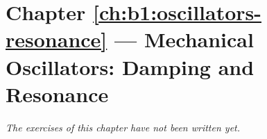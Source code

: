 \section*{Chapter \ref{ch:b1:oscillators-resonance} --- Mechanical Oscillators: Damping and Resonance}


\emph{The exercises of this chapter have not been written yet.}
